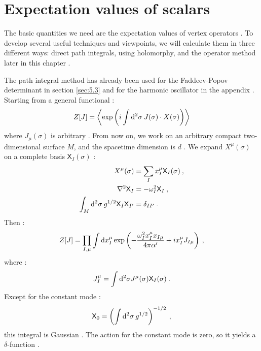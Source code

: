 \section{Expectation values of scalars} \label{sec:6.2}

The basic quantities we need are the expectation values of vertex operators . To develop several useful techniques and viewpoints, we will calculate them in three different ways: direct path integrals, using holomorphy, and the operator method later in this chapter .

The path integral method has already been used for the Faddeev-Popov determinant in section \ref{sec:5.3} and for the harmonic oscillator in the appendix . Starting from a general functional :
\begin{equation}
	Z[J]=\left\langle\exp \left(i \int \mathrm{d}^{2} \sigma\: J(\sigma) \cdot X(\sigma)\right)\right\rangle \label{6.2.1}
\end{equation}
where $J_{\mu}(\sigma)$ is arbitrary . From now on, we work on an arbitrary compact two-dimensional surface $M$, and the spacetime dimension is $d$ . We expand $X^{\mu}(\sigma)$ on a complete basis $\mathsf{X}_{I}(\sigma)$ :
\begin{subequations} \label{6.2.2}
	\begin{align}
		X^{\mu}(\sigma) &= \sum_{I} x_{I}^{\mu} \mathsf{X}_{I}(\sigma) \:, \label{6.2.2a} \\
		\nabla^{2} \mathsf{X}_{I} &= -\omega_{I}^{2} \mathsf{X}_{I} \:,  \label{6.2.2b} \\
		\int_{M} \mathrm{d}^{2} \sigma\: g^{1 / 2} \mathsf{X}_{I} \mathsf{X}_{I^{\prime}} &= \delta_{I I^{\prime}} \:. \label{6.2.2c} 
	\end{align}	
\end{subequations}
Then :
\begin{equation}
	Z[J]=\prod_{I, \mu} \int \mathrm{d} x_{I}^{\mu} \exp \left(-\frac{\omega_{I}^{2} x_{I}^{\mu} x_{I \mu}}{4 \pi \alpha^{\prime}}+i x_{I}^{\mu} J_{I \mu}\right) \:, \label{6.2.3}
\end{equation}
where :
\begin{equation}
	J_{I}^{\mu}=\int \mathrm{d}^{2} \sigma J^{\mu}(\sigma) \mathsf{X}_{I}(\sigma) \:. \label{6.2.4}
\end{equation}
Except for the constant mode :
\begin{equation}
	\mathsf{X}_{0}=\left(\int \mathrm{d}^{2} \sigma \: g^{1 / 2}\right)^{-1 / 2} \:, \label{6.2.5}
\end{equation}
this integral is Gaussian . The action for the constant mode is zero, so it yields a $\delta$-function .

